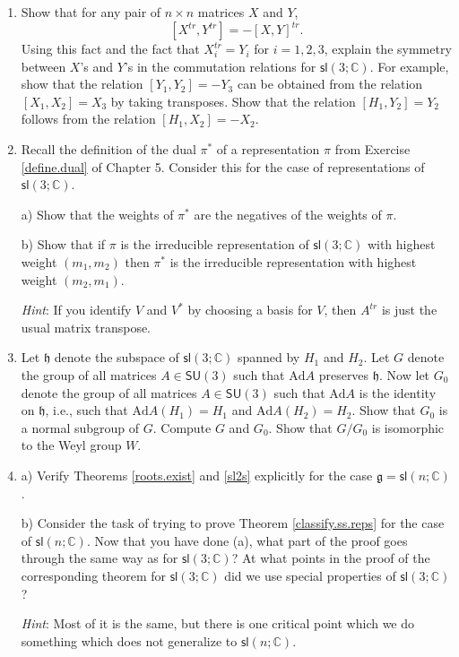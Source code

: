 \documentclass[12pt]{amsbook}
\let \frak = \mathfrak
\theoremstyle{plain}
\numberwithin{equation}{chapter}
\numberwithin{theorem}{chapter}
\begin{document}
\begin{enumerate}
\item \label{relations.tr}Show that for any pair of $n\times n$ matrices $X$
and $Y$,
\[
\left[  X^{tr},Y^{tr}\right]  =-\left[  X,Y\right]  ^{tr}\text{.}%
\]
Using this fact and the fact that $X_{i}^{tr}=Y_{i}$ for $i=1,2,3$, explain
the symmetry between $X$'s and $Y$'s in the commutation relations for
$\mathsf{sl}\left(  3;\mathbb{C}\right)  $. For example, show that the
relation $\left[  Y_{1},Y_{2}\right]  =-Y_{3}$ can be obtained from the
relation $\left[  X_{1},X_{2}\right]  =X_{3}$ by taking transposes. Show that
the relation $\left[  H_{1},Y_{2}\right]  =Y_{2}$ follows from the relation
$\left[  H_{1},X_{2}\right]  =-X_{2}$.

\item  Recall the definition of the dual $\pi^{\ast}$ of a representation
$\pi$ from Exercise \ref{define.dual} of Chapter 5. Consider this for the case
of representations of $\mathsf{sl}\left(  3;\mathbb{C}\right)  $.

a) Show that the weights of $\pi^{\ast}$ are the negatives of the weights of
$\pi$.

b) Show that if $\pi$ is the irreducible representation of $\mathsf{sl}\left(
3;\mathbb{C}\right)  $ with highest weight $\left(  m_{1},m_{2}\right)  $ then
$\pi^{\ast}$ is the irreducible representation with highest weight $\left(
m_{2},m_{1}\right)  $.

\textit{Hint}: If you identify $V$ and $V^{\ast}$ by choosing a basis for $V$,
then $A^{tr}$ is just the usual matrix transpose.

\item \label{weyl.quotient}Let $\frak{h}$ denote the subspace of
$\mathsf{sl}\left(  3;\mathbb{C}\right)  $ spanned by $H_{1}$ and $H_{2}$. Let
$G$ denote the group of all matrices $A\in\mathsf{SU}(3)$ such that
$\mathrm{Ad}A$ preserves $\frak{h}$. Now let $G_{0}$ denote the group of all
matrices $A\in\mathsf{SU}(3)$ such that $\mathrm{Ad}A$ is the identity on
$\frak{h}$, i.e., such that $\mathrm{Ad}A(H_{1})=H_{1}$ and $\mathrm{Ad}%
A(H_{2})=H_{2}$. Show that $G_{0}$ is a normal subgroup of $G$. Compute $G$
and $G_{0}$. Show that $G/G_{0}$ is isomorphic to the Weyl group $W$.

\item  a) Verify Theorems \ref{roots.exist} and \ref{sl2s} explicitly for the
case $\frak{g}=\mathsf{sl}\left(  n;\mathbb{C}\right)  $.

b) Consider the task of trying to prove Theorem \ref{classify.ss.reps} for the
case of $\mathsf{sl}\left(  n;\mathbb{C}\right)  $. Now that you have done
(a), what part of the proof goes through the same way as for $\mathsf{sl}%
\left(  3;\mathbb{C}\right)  $? At what points in the proof of the
corresponding theorem for $\mathsf{sl}\left(  3;\mathbb{C}\right)  $ did we
use special properties of $\mathsf{sl}\left(  3;\mathbb{C}\right)  $?

\textit{Hint}: Most of it is the same, but there is one critical point which
we do something which does not generalize to $\mathsf{sl}\left(
n;\mathbb{C}\right)  $.
\end{enumerate}
\end{document}
